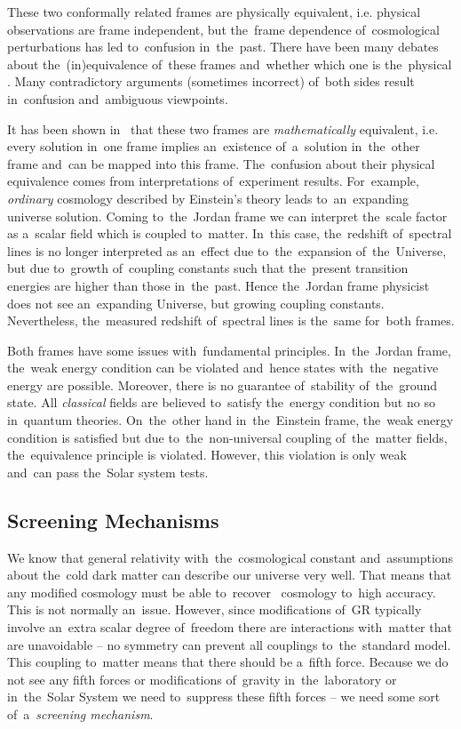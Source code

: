 These two conformally related frames are physically equivalent, i.e. physical observations are frame independent, but the~frame dependence of~cosmological perturbations has led to~confusion in~the~past. There have been many debates about the~(in)equivalence of~these frames \parencite{Postma:2014vaa} and~whether which one is the~physical \parencite{Faraoni:1999hp}. Many contradictory arguments (sometimes incorrect) of~both sides result in~confusion and~ambiguous viewpoints.

It has been shown in~\textcite{Magnano:1993bd} that these two frames are \textit{mathematically} equivalent, i.e. every solution in~one frame implies an~existence of~a~solution in~the~other frame and~can be mapped into this frame. The~confusion about their physical equivalence comes from interpretations of~experiment results. For~example, \textit{ordinary} cosmology described by Einstein’s theory leads to~an~expanding universe solution. Coming to~the~Jordan frame we can interpret the~scale factor as a~scalar field which is coupled to~matter. In~this case, the~redshift of~spectral lines is no longer interpreted as an~effect due to~the~expansion of~the~Universe, but due to~growth of~coupling constants such that the~present transition energies are higher than those in~the~past. Hence the~Jordan frame physicist does not see an~expanding Universe, but growing coupling constants. Nevertheless, the~measured redshift of~spectral lines is the~same for~both frames.

Both frames have some issues with~fundamental principles. In~the~Jordan frame, the~weak energy condition can be violated and~hence states with~the~negative energy are possible. Moreover, there is no guarantee of~stability of~the~ground state. All \textit{classical} fields are believed to~satisfy the~energy condition but no so in~quantum theories. On~the~other hand in~the~Einstein frame, the~weak energy condition is satisfied but due to~the~non-universal coupling of~the~matter fields, the~equivalence principle is violated. However, this violation is only weak and~can pass the~Solar system tests.

\subsection{Screening Mechanisms}
We know that general relativity with~the~cosmological constant and~assumptions about the~cold dark matter can describe our universe very well. That means that any modified cosmology must be able to~recover \LCDM\ cosmology to~high accuracy. This is not normally an~issue. However, since modifications of~GR typically involve an~extra scalar degree of~freedom there are interactions with~matter that are unavoidable -- no symmetry can prevent all couplings to~the~standard model. This coupling to~matter means that there should be a~fifth force. Because we do not see any fifth forces or modifications of~gravity in~the~laboratory or in~the~Solar System we need to~suppress these fifth forces -- we need some sort of~a~\textit{screening mechanism}.


